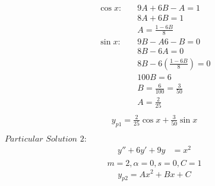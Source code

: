 \documentclass{article}
\begin{document}
    \begin{align*}
        \cos{x}: \quad &9A + 6B - A = 1 \\
        & 8A + 6B = 1\\
        & A = \frac{1 - 6B}{8} \\
        \sin{x}: \quad &9B -A6 - B = 0 \\
        & 8B - 6A = 0 \\
        & 8B - 6\left(\frac{1 - 6B}{8}\right) = 0 \\
        & 100B = 6 \\
        & B = \frac{6}{100} = \frac{3}{50}\\
        & A = \frac{2}{25} \\
    \end{align*}
    \begin{align*}
        y_{p1} = \frac{2}{25}\cos{x} + \frac{3}{50}\sin{x} \\
    \end{align*}
    $Particular$ $Solution$ $2:$
    \begin{align*}
        y'' + 6y' + 9y &= x^{2} \\
    \end{align*}
        $$m = 2, \alpha = 0, s = 0, C = 1$$
    \begin{align*}
        y_{p2} = Ax^{2} + Bx + C\\
    \end{align*}
\end{document}
